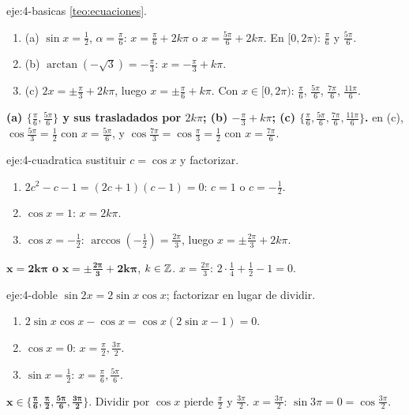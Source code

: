 \begin{solucion}{eje:4-basicas}
\planteamiento \cref{teo:ecuaciones}.
\pasos
\begin{enumerate}[label=\arabic*.]
  \item (a) $\sin x=\frac12$, $\alpha=\frac{\pi}{6}$: $x=\frac{\pi}{6}+2k\pi$ o $x=\frac{5\pi}{6}+2k\pi$. En $[0,2\pi)$: $\frac{\pi}{6}$ y $\frac{5\pi}{6}$.
  \item (b) $\arctan(-\sqrt3)=-\frac{\pi}{3}$: $x=-\frac{\pi}{3}+k\pi$.
  \item (c) $2x=\pm\frac{\pi}{3}+2k\pi$, luego $x=\pm\frac{\pi}{6}+k\pi$. Con $x\in[0,2\pi)$: $\frac{\pi}{6}$, $\frac{5\pi}{6}$, $\frac{7\pi}{6}$, $\frac{11\pi}{6}$.
\end{enumerate}
\resultado \textbf{(a) $\{\frac{\pi}{6},\frac{5\pi}{6}\}$ y sus trasladados por $2k\pi$; (b) $-\frac{\pi}{3}+k\pi$; (c) $\{\frac{\pi}{6},\frac{5\pi}{6},\frac{7\pi}{6},\frac{11\pi}{6}\}$.}
\comprobacion en (c), $\cos\frac{5\pi}{3}=\frac12$ con $x=\frac{5\pi}{6}$, y $\cos\frac{7\pi}{3}=\cos\frac{\pi}{3}=\frac12$ con $x=\frac{7\pi}{6}$.
\end{solucion}

\begin{solucion}{eje:4-cuadratica}
\planteamiento sustituir $c=\cos x$ y factorizar.
\pasos
\begin{enumerate}[label=\arabic*.]
  \item $2c^{2}-c-1=(2c+1)(c-1)=0$: $c=1$ o $c=-\frac12$.
  \item $\cos x=1$: $x=2k\pi$.
  \item $\cos x=-\frac12$: $\arccos(-\frac12)=\frac{2\pi}{3}$, luego $x=\pm\frac{2\pi}{3}+2k\pi$.
\end{enumerate}
\resultado $\mathbf{x=2k\pi}$ \textbf{o} $\mathbf{x=\pm\frac{2\pi}{3}+2k\pi}$, $k\in\mathbb{Z}$.
\comprobacion $x=\frac{2\pi}{3}$: $2\cdot\frac14+\frac12-1=0$.
\end{solucion}

\begin{solucion}{eje:4-doble}
\planteamiento $\sin2x=2\sin x\cos x$; factorizar en lugar de dividir.
\pasos
\begin{enumerate}[label=\arabic*.]
  \item $2\sin x\cos x-\cos x=\cos x(2\sin x-1)=0$.
  \item $\cos x=0$: $x=\frac{\pi}{2},\frac{3\pi}{2}$.
  \item $\sin x=\frac12$: $x=\frac{\pi}{6},\frac{5\pi}{6}$.
\end{enumerate}
\resultado $\mathbf{x\in\{\frac{\pi}{6},\frac{\pi}{2},\frac{5\pi}{6},\frac{3\pi}{2}\}}$. Dividir por $\cos x$ pierde $\frac{\pi}{2}$ y $\frac{3\pi}{2}$.
\comprobacion $x=\frac{3\pi}{2}$: $\sin3\pi=0=\cos\frac{3\pi}{2}$.
\end{solucion}

